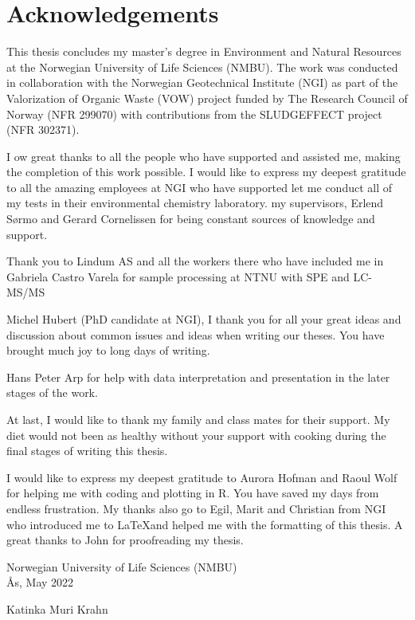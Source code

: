 \afterpage{\blankpage}
\newpage
{}
\section*{Acknowledgements}
This thesis concludes my master's degree in Environment and Natural Resources at the Norwegian University of Life Sciences (NMBU). The work was conducted in collaboration with the Norwegian Geotechnical Institute (NGI) as part of the Valorization of Organic Waste (VOW) project funded by The Research Council of Norway (NFR 299070) with contributions from the SLUDGEFFECT project (NFR 302371). 

I ow great thanks to all the people who have supported and assisted me, making the completion of this work possible. I would like to express my deepest gratitude to all the amazing employees at NGI who have supported let me conduct all of my tests in their environmental chemistry laboratory.
my supervisors, Erlend Sørmo and Gerard Cornelissen for being constant sources of knowledge and support. 
  

Thank you to Lindum AS and all the workers there  who have included me in 
Gabriela Castro Varela for sample processing at NTNU with SPE and LC-MS/MS

Michel Hubert (PhD candidate at NGI), I thank you for all your great ideas and discussion about common issues and ideas when writing our theses. You have brought much joy to long days of writing. 

Hans Peter Arp for help with data interpretation and presentation in the later stages of the work. 

At last, I would like to thank my family and class mates for their support. My diet would not been as healthy without your support with cooking during the final stages of writing this thesis. 

I would like to express my deepest gratitude to Aurora Hofman and Raoul Wolf for helping me with coding and plotting in R. You have saved my days from endless frustration. My thanks also go to Egil, Marit and Christian from NGI who introduced me to \LaTeX and helped me with the formatting of this thesis. A great thanks to John for proofreading my thesis. 

\vspace{3cm}

\begin{center}
Norwegian University of Life Sciences (NMBU) \\
Ås, May 2022
\end{center}
\vspace{1cm}
\begin{center}
Katinka Muri Krahn
\end{center}
